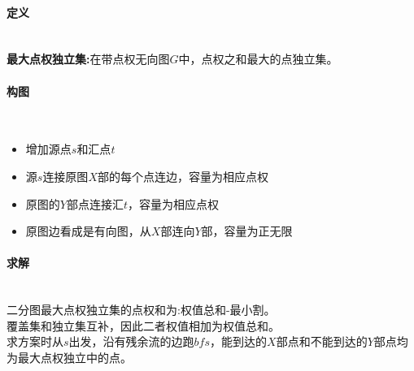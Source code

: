 \paragraph{定义}~{}
\\
\textbf{最大点权独立集:}在带点权无向图$G$中，点权之和最大的点独立集。

\paragraph{构图}~{}
\\
\begin{itemize}
\item 增加源点$s$和汇点$t$
\item 源$s$连接原图$X$部的每个点连边，容量为相应点权
\item 原图的$Y$部点连接汇$t$，容量为相应点权
\item 原图边看成是有向图，从$X$部连向$Y$部，容量为正无限
\end{itemize}

\paragraph{求解}~{}
\\
二分图最大点权独立集的点权和为:权值总和-最小割。\\
覆盖集和独立集互补，因此二者权值相加为权值总和。\\
求方案时从$s$出发，沿有残余流的边跑$bfs$，能到达的$X$部点和不能到达的$Y$部点均为最大点权独立中的点。